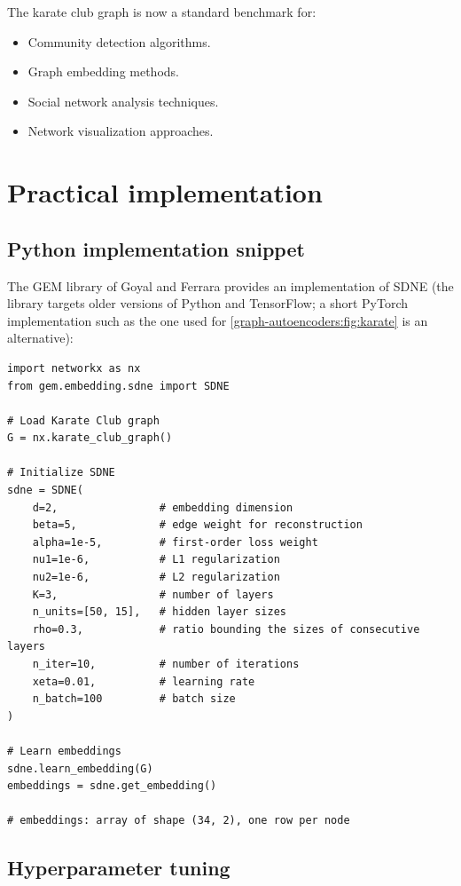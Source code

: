 \begin{notechapter}
The karate club graph is now a standard benchmark for:
\begin{itemize}
    \item Community detection algorithms.
    \item Graph embedding methods.
    \item Social network analysis techniques.
    \item Network visualization approaches.
\end{itemize}

\section{Practical implementation}

\subsection{Python implementation snippet}

The GEM library of Goyal and Ferrara provides an implementation of SDNE (the library targets older versions of Python and TensorFlow; a short PyTorch implementation such as the one used for \cref{graph-autoencoders:fig:karate} is an alternative):

\begin{verbatim}
import networkx as nx
from gem.embedding.sdne import SDNE

# Load Karate Club graph
G = nx.karate_club_graph()

# Initialize SDNE
sdne = SDNE(
    d=2,                # embedding dimension
    beta=5,             # edge weight for reconstruction
    alpha=1e-5,         # first-order loss weight
    nu1=1e-6,           # L1 regularization
    nu2=1e-6,           # L2 regularization
    K=3,                # number of layers
    n_units=[50, 15],   # hidden layer sizes
    rho=0.3,            # ratio bounding the sizes of consecutive layers
    n_iter=10,          # number of iterations
    xeta=0.01,          # learning rate
    n_batch=100         # batch size
)

# Learn embeddings
sdne.learn_embedding(G)
embeddings = sdne.get_embedding()

# embeddings: array of shape (34, 2), one row per node
\end{verbatim}

\subsection{Hyperparameter tuning}


\end{notechapter}

